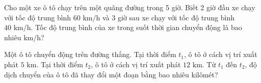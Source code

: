 \begin{ex} Cho một xe ô tô chạy trên một quãng đường trong 5 giờ. Biết 2 giờ đầu xe chạy với tốc độ trung bình $60\text{ km/h}$ và 3 giờ sau xe chạy với tốc độ trung bình $40\text{ km/h}$. Tốc độ trung bình của xe trong suốt thời gian chuyển động là bao nhiêu $\text{km/h}$?

\par{}
\end{ex}

\begin{ex} Một ô tô chuyển động trên đường thẳng. Tại thời điểm $t_1$, ô tô ở cách vị trí xuất phát $5\text{ km}$. Tại thời điểm $t_2$, ô tô ở cách vị trí xuất phát $12\text{ km}$. Từ $t_1$ đến $t_2$, độ dịch chuyển của ô tô đã thay đổi một đoạn bằng bao nhiêu kilômét?

\par{}
\end{ex}
